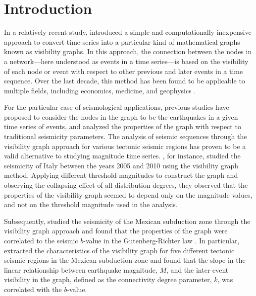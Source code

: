 
\section{Introduction}

In a relatively recent study, \citet{Lacasa2008} introduced a simple and computationally inexpensive approach to convert time-series into a particular kind of mathematical graphs known as visibility graphs. In this approach, the connection between the nodes in a network---here understood as events in a time series---is based on the visibility of each node or event with respect to other previous and later events in a time sequence. Over the last decade, this method has been found to be applicable to multiple fields, including economics, medicine, and geophysics \citep[e.g.,][]{Yang_2009_PA, Elsner_2009_GRL, Telesca2012_CSF, Wang2012, Long2013}.

For the particular case of seismological applications, previous studies have proposed to consider the nodes in the graph to be the earthquakes in a given time series of events, and analyzed the properties of the graph with respect to traditional seismicity parameters. The analysis of seismic sequences through the visibility graph approach for various tectonic seismic regions has proven to be a valid alternative to studying magnitude time series. \citet{Telesca2012}, for instance, studied the seismicity of Italy between the years 2005 and 2010 using the visibility graph method. Applying different threshold magnitudes to construct the graph and observing the collapsing effect of all distribution degrees, they observed that the properties of the visibility graph seemed to depend only on the magnitude values, and not on the threshold magnitude used in the analysis. 

Subsequently, \citet{Telesca2013} studied the seismicity of the Mexican subduction zone through the visibility graph approach and found that the properties of the graph were correlated to the seismic $b$-value in the Gutenberg-Richter law \citep{Gutenberg1944}. In particular, \citet{Telesca2013} extracted the characteristics of the visibility graph for five different tectonic seismic regions in the Mexican subduction zone and found that the slope in the linear relationship between earthquake magnitude, $M$, and the inter-event visibility in the graph, defined as the connectivity degree parameter, $k$, was correlated with the $b$-value.

